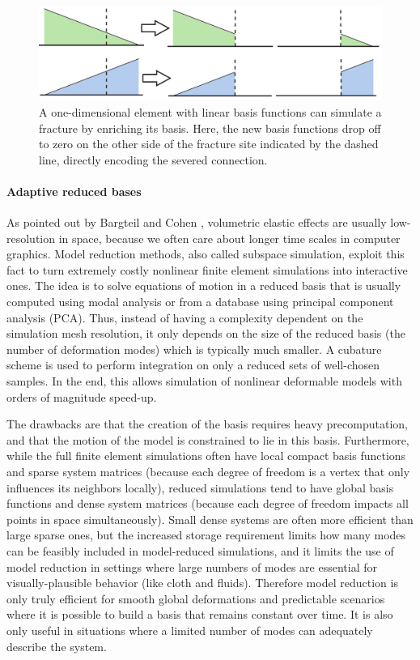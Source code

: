 \begin{figure}[t]
\centering
\includegraphics[width=\linewidth]{images/starAdaptivity-cgf2016/xfem.png}
\caption{\label{fig:basisenrichment}
A one-dimensional element with linear basis functions can simulate a fracture by enriching its basis. Here, the new basis functions drop off to zero on the other side of the fracture site indicated by the dashed line, directly encoding the severed connection.
}
\end{figure}

\paragraph*{Adaptive reduced bases}
As pointed out by Bargteil and Cohen \cite{bargteil2014animation}, volumetric elastic effects are usually low-resolution in space, because we often care about longer time scales in computer graphics.
Model reduction methods, also called subspace simulation, exploit this fact to turn extremely costly nonlinear finite element simulations into interactive ones.
The idea is to solve equations of motion in a reduced basis that is usually computed using modal analysis or from a database using principal component analysis (PCA).
Thus, instead of having a complexity dependent on the simulation mesh resolution, it only depends on the size of the reduced basis (the number of deformation modes) which is typically much smaller.
A cubature scheme is used to perform integration on only a reduced sets of well-chosen samples. In the end, this allows simulation of nonlinear deformable models with orders of magnitude speed-up.

The drawbacks are that the creation of the basis requires heavy precomputation, and that the motion of the model is constrained to lie in this basis. Furthermore, while the full finite element simulations often have local compact basis functions and sparse system matrices (because each degree of freedom is a vertex that only influences its neighbors locally), reduced simulations tend to have global basis functions and dense system matrices (because each degree of freedom impacts all points in space simultaneously). Small dense systems are often more efficient than large sparse ones, but the increased storage requirement limits how many modes can be feasibly included in model-reduced simulations, and it limits the use of model reduction in settings where large numbers of modes are essential for visually-plausible behavior (like cloth and fluids).
Therefore model reduction is only truly efficient for smooth global deformations and predictable scenarios where it is possible to build a basis that remains constant over time. It is also only useful in situations where a limited number of modes can adequately describe the system.

